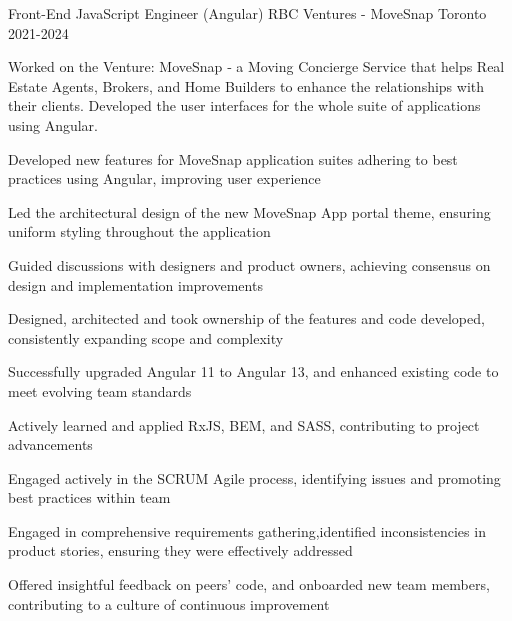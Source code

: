 

\begin{cventries}
	
	
  \cventry
{Front-End JavaScript Engineer (Angular)} %
{RBC Ventures - MoveSnap} %
{Toronto} %
{2021-2024} %
{Worked on the Venture: MoveSnap ‑ a Moving Concierge Service that helps Real Estate Agents, Brokers, and Home Builders to enhance the relationships with their clients. Developed the user interfaces for the whole suite of applications using Angular.
	\vspace{6.0mm}
	\begin{cvitems}
		\item
		{Developed new features for MoveSnap application suites adhering to best practices using Angular, improving user experience}
		\item
		{Led the architectural design of the new MoveSnap App portal theme, ensuring uniform styling throughout the application}
		\item
		{Guided discussions with designers and product owners, achieving consensus on design and implementation improvements}
		\item
		{Designed, architected and took ownership of the features and code developed, consistently expanding scope and complexity}
		\item
		{Successfully upgraded Angular 11 to Angular 13, and enhanced existing code to meet evolving team standards}
		\item
		{Actively learned and applied RxJS, BEM, and SASS, contributing to project advancements}
		\item
		{Engaged actively in the SCRUM Agile process, identifying issues and promoting best practices within team}
		\item 
		{Engaged in comprehensive requirements gathering,identified inconsistencies in product stories, ensuring they were effectively addressed}
		\item 
		{Offered insightful feedback on peers' code, and onboarded new team members, contributing to a culture of continuous improvement}

\end{cvitems}}
\end{cventries}
